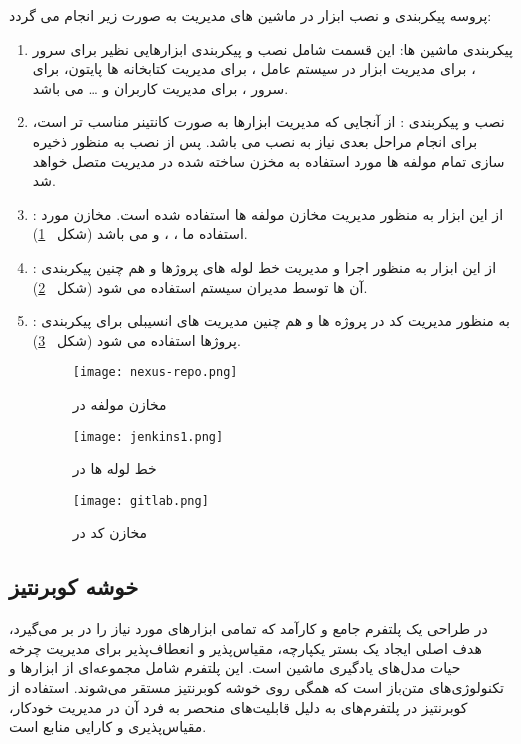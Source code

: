 پروسه پیکربندی و نصب ابزار در ماشین های مدیریت به صورت زیر انجام می گردد:
\begin{enumerate}
	\item 
	پیکربندی ماشین ها:
این قسمت شامل نصب و پیکربندی ابزارهایی نظیر
برای سرور ،
برای مدیریت ابزار در سیستم عامل ،
برای مدیریت کتابخانه ها پایتون،
برای سرور 
، 
برای مدیریت کاربران و … می باشد.
	\item
نصب و پیکربندی : از آنجایی که مدیریت ابزارها به صورت کانتینر مناسب تر است، برای انجام مراحل بعدی نیاز به نصب  می باشد. پس از نصب به منظور ذخیره سازی تمام مولفه ها مورد استفاده به مخزن ساخته شده در  مدیریت متصل خواهد شد.
	\item 
 : از این ابزار به منظور مدیریت مخازن مولفه ها استفاده شده است. مخازن مورد استفاده ما ، 
	،
	و  می باشد (شکل 
	~\ref{fig: nexus repo}).

	\item 
 : از این ابزار به منظور اجرا و مدیریت خط لوله های  پروژها و هم چنین پیکربندی آن ها توسط مدیران سیستم استفاده می شود (شکل 
	~\ref{fig: jenkins}).
	
	\item 
 : به منظور مدیریت کد در پروژه ها و هم چنین مدیریت های انسیبلی برای پیکربندی پروژها استفاده می شود (شکل 
	~\ref{fig: gitlab}).
	
\begin{figure}[t]
	\centering
	\texttt{[image: nexus-repo.png]}
	\caption{مخازن مولفه در }
	\label{fig: nexus repo}
\end{figure}
\begin{figure}[t]
	\centering
	\texttt{[image: jenkins1.png]}
	\caption{خط لوله ها  در }
	\label{fig: jenkins}
\end{figure}
\begin{figure}[t]
	\centering
	\texttt{[image: gitlab.png]}
	\caption{مخازن کد در }
	\label{fig: gitlab}
\end{figure}
\end{enumerate}


\subsection{خوشه کوبرنتیز}
در طراحی یک پلتفرم  جامع و کارآمد که تمامی ابزارهای مورد نیاز را در بر می‌گیرد، هدف اصلی ایجاد یک بستر یکپارچه، مقیاس‌پذیر و انعطاف‌پذیر برای مدیریت چرخه حیات مدل‌های یادگیری ماشین است. این پلتفرم شامل مجموعه‌ای از ابزارها و تکنولوژی‌های متن‌باز است که همگی روی خوشه کوبرنتیز مستقر می‌شوند. استفاده از کوبرنتیز در پلتفرم‌های  به دلیل قابلیت‌های منحصر به فرد آن در مدیریت خودکار، مقیاس‌پذیری و کارایی منابع است. 

